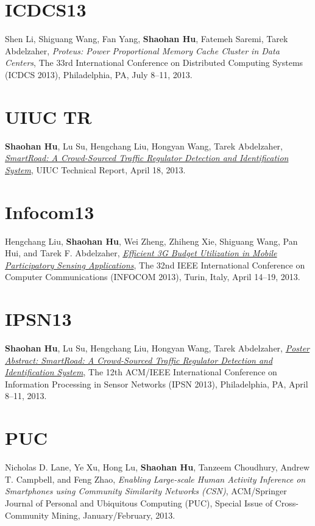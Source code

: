 \section{\sc ICDCS13}\hypertarget{li2013icdcs}{}
Shen Li, Shiguang Wang, Fan Yang, \textbf{Shaohan Hu}, Fatemeh Saremi,
Tarek Abdelzaher, \emph{Proteus: Power Proportional Memory Cache
  Cluster in Data Centers}, \textsf{The 33rd International Conference
  on Distributed Computing Systems (ICDCS 2013)}, Philadelphia, PA,
July 8--11, 2013.

\section{\sc UIUC TR}\hypertarget{hu2013uiuc1}{}
\textbf{Shaohan Hu}, Lu Su, Hengchang Liu, Hongyan Wang, Tarek
Abdelzaher, \href{https://www.ideals.illinois.edu/handle/2142/43856}{\emph{SmartRoad: A Crowd-Sourced Traffic Regulator
  Detection and Identification System}}, \textsf{UIUC Technical
  Report}, April 18, 2013.

\section{\sc Infocom13}\hypertarget{liu2013infocom}{}
Hengchang Liu, \textbf{Shaohan Hu}, Wei Zheng, Zhiheng Xie, Shiguang
Wang, Pan Hui, and Tarek F. Abdelzaher, \href{http://ieeexplore.ieee.org/xpl/articleDetails.jsp?tp=&arnumber=6566935}{\emph{Efficient 3G Budget
  Utilization in Mobile Participatory Sensing Applications}},
\textsf{The 32nd IEEE International Conference on Computer
  Communications (INFOCOM 2013)}, Turin, Italy, April 14--19, 2013.

\section{\sc IPSN13}\hypertarget{hu2013ipsn}{}
\textbf{Shaohan Hu}, Lu Su, Hengchang Liu, Hongyan Wang, Tarek
Abdelzaher, \href{http://portal.acm.org/citation.cfm?id=2461433}{\emph{Poster Abstract: SmartRoad: A Crowd-Sourced Traffic
  Regulator Detection and Identification System}}, \textsf{The 12th
  ACM/IEEE International Conference on Information Processing in
  Sensor Networks (IPSN 2013)}, Philadelphia, PA, April 8--11, 2013.

\section{\sc PUC}\hypertarget{lane2013puc}{}
Nicholas D. Lane, Ye Xu, Hong Lu, \textbf{Shaohan Hu}, Tanzeem
Choudhury, Andrew T. Campbell, and Feng Zhao, \emph{Enabling
  Large-scale Human Activity Inference on Smartphones using Community
  Similarity Networks (CSN)}, \textsf{ACM/Springer Journal of Personal
  and Ubiquitous Computing (PUC), Special Issue of Cross-Community
  Mining}, January/February, 2013.

